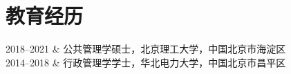 \section{教育经历}

\begin{EntriesTable}{0.18}{0.02}{0.80}
    2018--2021 & 公共管理学硕士，北京理工大学，中国北京市海淀区 \\
    2014--2018 & 行政管理学学士，华北电力大学，中国北京市昌平区 \\
\end{EntriesTable}
